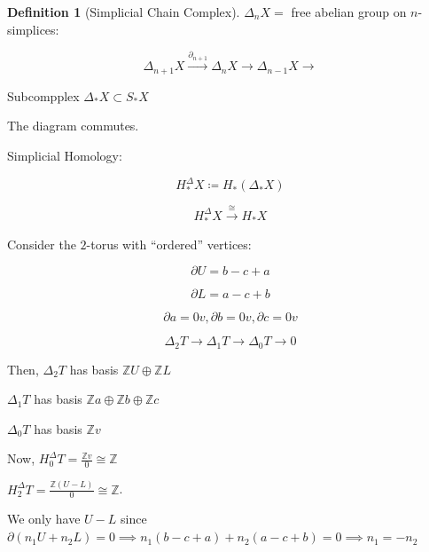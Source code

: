 \documentclass{article}
\theoremstyle{definition}
\newtheorem*{definition}{Definition}
\begin{document}
    \begin{definition}
        [Simplicial Chain Complex] \(\Delta_n X =\) free abelian group on \(n\)-simplices:

        \[
            \Delta_{n+1} X \xrightarrow{\partial_{n+1}} \Delta_n X \to \Delta_{n-1} X \to 
        \]

        Subcompplex \(\Delta_{\ast} X \subset S_{\ast} X\) 

        \begin{center}
        \end{center}

        The diagram commutes.

        Simplicial Homology:

        \[
            H_{\ast} ^\Delta X \coloneqq H_{\ast} (\Delta_{\ast} X)
        \]

        \[
            H_{\ast}^\Delta X \xrightarrow{\cong} H_{\ast} X
        \]
        
    \end{definition}

    Consider the \(2\)-torus with ``ordered'' vertices:



    \[
        \partial U = b-c+a
    \]

    \[
        \partial L = a-c+b
    \]

    \[
        \partial a = 0v, \partial b = 0v, \partial c = 0v
    \]

    \[
        \Delta_2 T \to \Delta_1 T \to \Delta_0 T \to 0
    \]

    Then, \(\Delta_2 T\) has basis \(\mathbb{Z} U \oplus \mathbb{Z} L\)

    \(\Delta_1 T\) has basis \(\mathbb{Z} a \oplus \mathbb{Z} b \oplus \mathbb{Z} c\)
    
    \(\Delta_0 T\) has basis \(\mathbb{Z}v\)

    Now, \(H_0^\Delta T = \frac{\mathbb{Z} v}{0} \cong \mathbb{Z}\) 

    \(H_2^\Delta T = \frac{\mathbb{Z}(U-L)}{0}\cong \mathbb{Z}\).

    We only have \(U-L\) since \(\partial(n_1 U + n_2 L) = 0 \implies n_1(b-c+a) + n_2(a-c+b) = 0 \implies n_1 = -n_2\)
\end{document}
